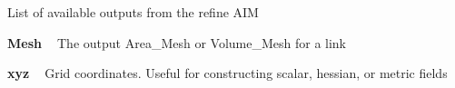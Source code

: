 List of available outputs from the refine AIM


\begin{DoxyItemize}
\item {\bfseries{ Mesh }} ~\newline
 The output Area\+\_\+\+Mesh or Volume\+\_\+\+Mesh for a link
\item {\bfseries{ xyz }} ~\newline
 Grid coordinates. Useful for constructing scalar, hessian, or metric fields 
\end{DoxyItemize}